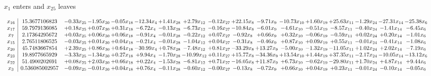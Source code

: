 \documentclass[9pt]{article}
\begin{document}
 $ x_{1} $ enters and $ x_{25} $ leaves 

 \[\begin{array}{c| c c@{\hskip 2pt} c@{\hskip 2pt} c@{\hskip 2pt} c@{\hskip 2pt} c@{\hskip 2pt} c@{\hskip 2pt} c@{\hskip 2pt} c@{\hskip 2pt} c@{\hskip 2pt} c@{\hskip 2pt} c@{\hskip 2pt} c@{\hskip 2pt} c@{\hskip 2pt} c@{\hskip 2pt} c@{\hskip 2pt} }
 x_{16}   &  15.3677106823 & -0.33 x_{25} & -1.95 x_{30} & -0.05 x_{18} & -12.34 x_{4} & +  1.41 x_{28} & +  2.79 x_{12} & -0.12 x_{27} & + 22.15 x_{8} & -9.71 x_{9} & -10.73 x_{10} & +  1.60 x_{19} & + 25.63 x_{11} & -1.29 x_{24} & -27.31 x_{14} & -25.38 x_{6}\\
 x_{17}   &  59.7979136085 & +  0.18 x_{25} & +  0.07 x_{30} & +  0.31 x_{18} & -6.72 x_{4} & -0.13 x_{28} & -6.73 x_{12} & -0.16 x_{27} & -10.84 x_{8} & -6.01 x_{9} & -4.61 x_{10} & -0.51 x_{19} & -8.57 x_{11} & -0.40 x_{24} & -1.41 x_{14} & -6.45 x_{6}\\
 x_{7}   &  2.17364295672 & +  0.03 x_{25} & +  0.06 x_{30} & +  0.06 x_{18} & -0.91 x_{4} & -0.01 x_{28} & -0.22 x_{12} & +  0.07 x_{27} & -0.92 x_{8} & +  0.66 x_{9} & +  0.32 x_{10} & -0.06 x_{19} & -0.59 x_{11} & +  0.02 x_{24} & +  0.20 x_{14} & -1.01 x_{6}\\
 x_{15}   &  2.76511806525 & -0.03 x_{25} & +  0.01 x_{30} & +  0.04 x_{18} & -0.21 x_{4} & -0.01 x_{28} & -1.04 x_{12} & +  0.04 x_{27} & -0.31 x_{8} & -0.46 x_{9} & +  0.87 x_{10} & +  0.09 x_{19} & +  0.55 x_{11} & -0.01 x_{24} & -0.41 x_{14} & -1.08 x_{6}\\
 x_{20}   &  45.7483667854 & +  2.39 x_{25} & +  0.86 x_{30} & +  0.64 x_{18} & -30.99 x_{4} & +  0.78 x_{28} & -7.48 x_{12} & +  0.81 x_{27} & -33.29 x_{8} & + 13.27 x_{9} & -5.00 x_{10} & -1.32 x_{19} & -11.05 x_{11} & +  1.02 x_{24} & +  2.02 x_{14} & -7.19 x_{6}\\
 x_{23}   &  19.8977665929 & -3.33 x_{25} & -1.34 x_{30} & +  0.27 x_{18} & +  9.94 x_{4} & -1.70 x_{28} & -10.99 x_{12} & +  0.11 x_{27} & + 15.77 x_{8} & -34.36 x_{9} & + 13.54 x_{10} & +  1.44 x_{19} & + 37.35 x_{11} & -2.17 x_{24} & -10.05 x_{14} & -13.12 x_{6}\\
 x_{22}   &  51.4900202691 & +  0.08 x_{25} & +  2.03 x_{30} & +  0.66 x_{18} & +  0.22 x_{4} & -1.53 x_{28} & -6.81 x_{12} & +  0.71 x_{27} & -16.05 x_{8} & + 11.87 x_{9} & +  6.73 x_{10} & -0.62 x_{19} & -29.80 x_{11} & +  1.70 x_{24} & +  4.87 x_{14} & +  9.44 x_{6}\\
 x_{3}   &  0.536085002957 & -0.09 x_{25} & -0.01 x_{30} & +  0.04 x_{18} & +  0.76 x_{4} & -0.11 x_{28} & -0.60 x_{12} & -0.00 x_{27} & -0.13 x_{8} & -0.72 x_{9} & +  0.66 x_{10} & +  0.04 x_{19} & +  0.23 x_{11} & -0.01 x_{24} & -0.10 x_{14} & -0.05 x_{6}\\

\end{array}\]
\end{document}
